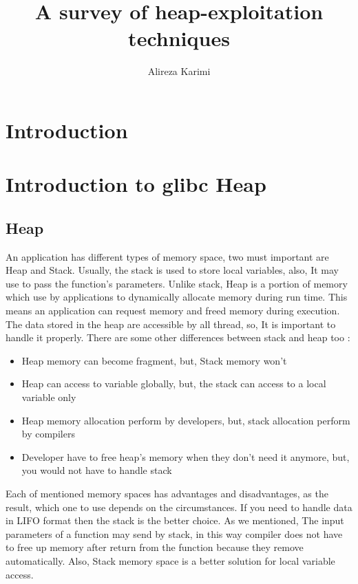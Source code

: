 \documentclass{masterthesis}
\newcommand*\libc{glibc}
\begin{document}
\title{A survey of heap-exploitation techniques}

\author{Alireza Karimi}



\maketitle

\tableofcontents

\chapter{Introduction}

\chapter{Introduction to \libc{} Heap}

\section{Heap}

An application has different types of memory space, two must important are Heap and Stack. Usually, the stack is used to store local variables, also, It may use to pass the function's parameters. Unlike stack, Heap is a portion of memory which use by applications to dynamically allocate memory during run time. This means an application can request memory and freed memory during execution. The data stored in the heap are accessible by all thread, so, It is important to handle it properly. There are some other differences between stack and heap too :
\begin{itemize}
	\item Heap memory can become fragment, but, Stack memory won't
	\item Heap can access to variable globally, but, the stack can access to a local variable only
	\item Heap memory allocation perform by developers, but, stack allocation perform by compilers
	\item Developer have to free heap's memory when they don't need it anymore, but, you would not have to handle stack
\end{itemize}
Each of mentioned memory spaces has advantages and disadvantages, as the result, which one to use depends on the circumstances. If you need to handle data in LIFO format then the stack is the better choice. As we mentioned, The input parameters of a function may send by stack, in this way compiler does not have to free up memory after return from the function because they remove automatically. Also, Stack memory space is a better solution for local variable access.
\end{document}
